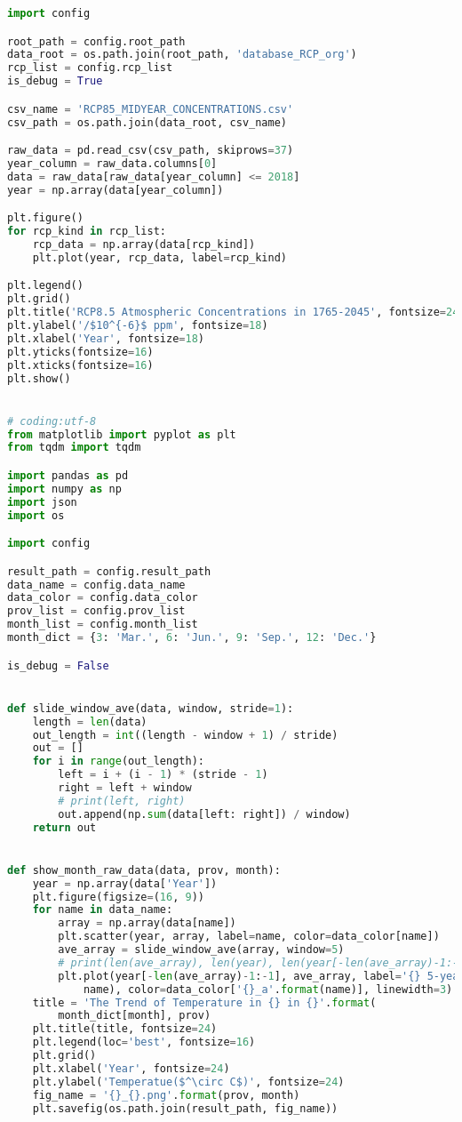 \documentclass[bwprint]{gmcmthesis}
\begin{document}
\begin{lstlisting}[language=Python]
import config

root_path = config.root_path
data_root = os.path.join(root_path, 'database_RCP_org')
rcp_list = config.rcp_list
is_debug = True

csv_name = 'RCP85_MIDYEAR_CONCENTRATIONS.csv'
csv_path = os.path.join(data_root, csv_name)

raw_data = pd.read_csv(csv_path, skiprows=37)
year_column = raw_data.columns[0]
data = raw_data[raw_data[year_column] <= 2018]
year = np.array(data[year_column])

plt.figure()
for rcp_kind in rcp_list:
    rcp_data = np.array(data[rcp_kind])
    plt.plot(year, rcp_data, label=rcp_kind)

plt.legend()
plt.grid()
plt.title('RCP8.5 Atmospheric Concentrations in 1765-2045', fontsize=24)
plt.ylabel('/$10^{-6}$ ppm', fontsize=18)
plt.xlabel('Year', fontsize=18)
plt.yticks(fontsize=16)
plt.xticks(fontsize=16)
plt.show()


# coding:utf-8
from matplotlib import pyplot as plt
from tqdm import tqdm

import pandas as pd
import numpy as np
import json
import os

import config

result_path = config.result_path
data_name = config.data_name
data_color = config.data_color
prov_list = config.prov_list
month_list = config.month_list
month_dict = {3: 'Mar.', 6: 'Jun.', 9: 'Sep.', 12: 'Dec.'}

is_debug = False


def slide_window_ave(data, window, stride=1):
    length = len(data)
    out_length = int((length - window + 1) / stride)
    out = []
    for i in range(out_length):
        left = i + (i - 1) * (stride - 1)
        right = left + window
        # print(left, right)
        out.append(np.sum(data[left: right]) / window)
    return out


def show_month_raw_data(data, prov, month):
    year = np.array(data['Year'])
    plt.figure(figsize=(16, 9))
    for name in data_name:
        array = np.array(data[name])
        plt.scatter(year, array, label=name, color=data_color[name])
        ave_array = slide_window_ave(array, window=5)
        # print(len(ave_array), len(year), len(year[-len(ave_array)-1:-1]))
        plt.plot(year[-len(ave_array)-1:-1], ave_array, label='{} 5-year Average'.format(
            name), color=data_color['{}_a'.format(name)], linewidth=3)
    title = 'The Trend of Temperature in {} in {}'.format(
        month_dict[month], prov)
    plt.title(title, fontsize=24)
    plt.legend(loc='best', fontsize=16)
    plt.grid()
    plt.xlabel('Year', fontsize=24)
    plt.ylabel('Temperatue($^\circ C$)', fontsize=24)
    fig_name = '{}_{}.png'.format(prov, month)
    plt.savefig(os.path.join(result_path, fig_name))



\end{lstlisting}
\end{document}
